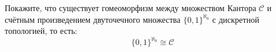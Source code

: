\begin{task}
    Покажите, что существует гомеоморфизм между множеством Кантора \( \mathcal{C} \) и счётным произведением двуточечного множества \( \{0, 1\}^{\aleph_0} \) с дискретной топологией, то есть:
    \[
    \{0, 1\}^{\aleph_0} \cong \mathcal{C}
    \]
\end{task}
